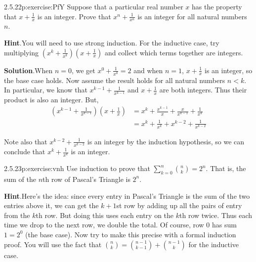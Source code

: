 \documentclass[twoside,11pt,]{book}
\newcommand{\blocktitlefont}{\relax}
\numberwithin{equation}{chapter}
\renewcommand{\d}{\displaystyle}
\newcommand{\lt}{<}
\newcommand{\amp}{&}
\begin{document}
\begin{divisionsolution}{2.5.22}{}{p:exercise:PfY}%
Suppose that a particular real number \(x\) has the property that \(x + \frac{1}{x}\) is an integer. Prove that \(x^n + \frac{1}{x^n}\) is an integer for all natural numbers \(n\).%
\par\smallskip%
\noindent\textbf{\blocktitlefont Hint}.\quad{}You will need to use strong induction. For the inductive case, try multiplying \(\left (x^k + \frac{1}{x^{k}}\right)\left(x+\frac{1}{x}\right)\) and collect which terms together are integers.%
\par\smallskip%
\noindent\textbf{\blocktitlefont Solution}.\quad{}When \(n = 0\), we get \(x^0 +\frac{1}{x^0} = 2\) and when \(n = 1\), \(x + \frac{1}{x}\) is an integer, so the base case holds. Now assume the result holds for all natural numbers \(n \lt  k\). In particular, we know that \(x^{k-1} + \frac{1}{x^{k-1}}\) and \(x + \frac{1}{x}\) are both integers. Thus their product is also an integer. But,%
\begin{align*}
\left(x^{k-1} + \frac{1}{x^{k-1}}\right)\left(x + \frac{1}{x}\right) \amp = x^k + \frac{x^{k-1}}{x} + \frac{x}{x^{k-1}} + \frac{1}{x^k}\\
\amp = x^k + \frac{1}{x^k} + x^{k-2} + \frac{1}{x^{k-2}}
\end{align*}
%
\par
Note also that \(x^{k-2} + \frac{1}{x^{k-2}}\) is an integer by the induction hypothesis, so we can conclude that \(x^k + \frac{1}{x^k}\) is an integer.%
\end{divisionsolution}%
\begin{divisionsolution}{2.5.23}{}{p:exercise:vnh}%
Use induction to prove that \(\d\sum_{k=0}^n {n \choose k} = 2^n\). That is, the sum of the \(n\)th row of Pascal's Triangle is \(2^n\).%
\par\smallskip%
\noindent\textbf{\blocktitlefont Hint}.\quad{}Here's the idea: since every entry in Pascal's Triangle is the sum of the two entries above it, we can get the \(k+1\)st row by adding up all the pairs of entry from the \(k\)th row. But doing this uses each entry on the \(k\)th row twice. Thus each time we drop to the next row, we double the total. Of course, row 0 has sum \(1 = 2^0\) (the base case). Now try to make this precise with a formal induction proof. You will use the fact that \({n \choose k} = {n-1 \choose k-1} + {n-1 \choose k}\) for the inductive case.%
\end{divisionsolution}%
\end{document}
